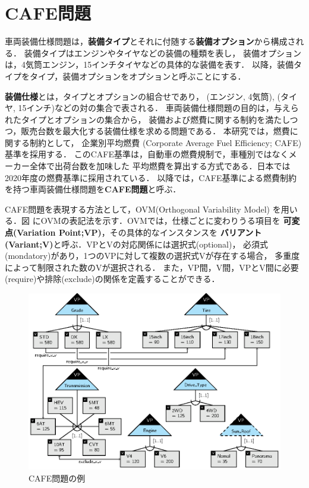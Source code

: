 \section{CAFE問題}

車両装備仕様問題は，\textbf{装備タイプ}とそれに付随する\textbf{装備オプション}から構成される．
装備タイプはエンジンやタイヤなどの装備の種類を表し，
装備オプションは，4気筒エンジン，15インチタイヤなどの具体的な装備を表す．
以降，装備タイプをタイプ，装備オプションをオプションと呼ぶことにする．


\textbf{装備仕様}とは，タイプとオプションの組合せであり，
(エンジン, 4気筒), (タイヤ, 15インチ)などの対の集合で表される．
車両装備仕様問題の目的は，与えられたタイプとオプションの集合から，
装備および燃費に関する制約を満たしつつ，販売台数を最大化する装備仕様を求める問題である．
本研究では，燃費に関する制約として，
企業別平均燃費 (Corporate Average Fuel Efficiency; CAFE)基準を採用する．
このCAFE基準は，自動車の燃費規制で，車種別ではなくメーカー全体で出荷台数を加味した
平均燃費を算出する方式である．日本では2020年度の燃費基準に採用されている．
以降では，CAFE基準による燃費制約を持つ車両装備仕様問題を\textbf{CAFE問題}と呼ぶ．

CAFE問題を表現する方法として，OVM(Orthogonal Variability Model)
\cite{Pohl05:sple}を用いる．図%
にOVMの表記法を示す．OVMでは，仕様ごとに変わりうる項目を
\textbf{可変点(Variation Point;VP)}，その具体的なインスタンスを
\textbf{バリアント(Variant;V)}と呼ぶ．VPとVの対応関係には選択式(optional)，
必須式(mondatory)があり，1つのVPに対して複数の選択式Vが存在する場合，
多重度によって制限された数のVが選択される．
また，VP間，V間，VPとV間に必要(require)や排除(exclude)の関係を定義することができる．

\begin{figure}[t]
 \centerline {\includegraphics{images/ovm01.eps}}
 \caption{CAFE問題の例}
 \label{fig:ovm_example}
\end{figure}

